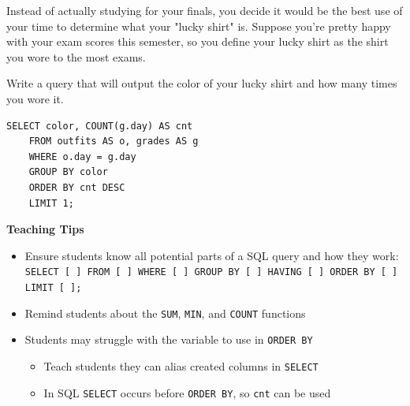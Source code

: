 \begin{blocksection}

Instead of actually studying for your finals, you decide it would be the best use of your time to determine what your "lucky shirt" is. Suppose you're pretty happy with your exam scores this semester, so you define your lucky shirt as the shirt you wore to the most exams.

Write a query that will output the color of your lucky shirt and how many times you wore it.

\begin{solution}[1.5in]
\begin{lstlisting}
SELECT color, COUNT(g.day) AS cnt
    FROM outfits AS o, grades AS g
    WHERE o.day = g.day
    GROUP BY color
    ORDER BY cnt DESC
    LIMIT 1;
\end{lstlisting}
\end{solution}
\end{blocksection}

\begin{guide}
\begin{blocksection}
\textbf{Teaching Tips}
\begin{itemize}
  \item Ensure students know all potential parts of a SQL query and how they work:
  \\\lstinline{SELECT [ ] FROM [ ] WHERE [ ] GROUP BY [ ] HAVING [ ] ORDER BY [ ] LIMIT [ ];}
  \item Remind students about the \lstinline{SUM}, \lstinline{MIN}, and \lstinline{COUNT} functions
  \item Students may struggle with the variable to use in \lstinline{ORDER BY}
  \begin{itemize}
    \item Teach students they can alias created columns in \lstinline{SELECT}
    \item In SQL \lstinline{SELECT} occurs before \lstinline{ORDER BY}, so \lstinline{cnt} can be used
  \end{itemize}
\end{itemize}
\end{blocksection}
\end{guide}
